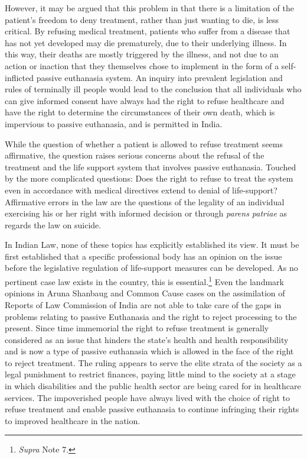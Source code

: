 \begin{multicols}{2}
\noi
However, it may be argued that this problem in that there is a limitation of the patient’s
freedom to deny treatment, rather than just wanting to die, is less critical. By refusing medical
treatment, patients who suffer from a disease that has not yet developed may die prematurely,
due to their underlying illness. In this way, their deaths are mostly triggered by the illness,
and not due to an action or inaction that they themselves chose to implement in the form of a
self-inflicted passive euthanasia system. An inquiry into prevalent legislation and rules of
terminally ill people would lead to the conclusion that all individuals who can give informed
consent have always had the right to refuse healthcare and have the right to determine the
circumstances of their own death, which is impervious to passive euthanasia, and is permitted
in India.

\noi
While the question of whether a patient is allowed to refuse treatment seems affirmative, the
question raises serious concerns about the refusal of the treatment and the life support system
that involves passive euthanasia. Touched by the more complicated questions: Does the right
to refuse to treat the system even in accordance with medical directives extend to denial of
life-support? Affirmative errors in the law are the questions of the legality of an individual
exercising his or her right with informed decision or through \textit{parens patriae} as regards the
law on suicide.

\noi
In Indian Law, none of these topics has explicitly established its view. It must be first
established that a specific professional body has an opinion on the issue before the legislative
regulation of life-support measures can be developed. As no pertinent case law exists in the
country, this is essential.\footnote{\textit{Supra} Note 7.} Even the landmark opinions in Aruna Shanbaug and Common
Cause cases on the assimilation of Reports of Law Commission of India are not able to take
care of the gaps in problems relating to passive Euthanasia and the right to reject processing
to the present. Since time immemorial the right to refuse treatment is generally considered as
an issue that hinders the state's health and health responsibility and is now a type of passive
euthanasia which is allowed in the face of the right to reject treatment. The ruling appears to
serve the elite strata of the society as a legal punishment to restrict finances, paying little
mind to the society at a stage in which disabilities and the public health sector are being cared
for in healthcare services. The impoverished people have always lived with the choice of
right to refuse treatment and enable passive euthanasia to continue infringing their rights to
improved healthcare in the nation.


\end{multicols}
